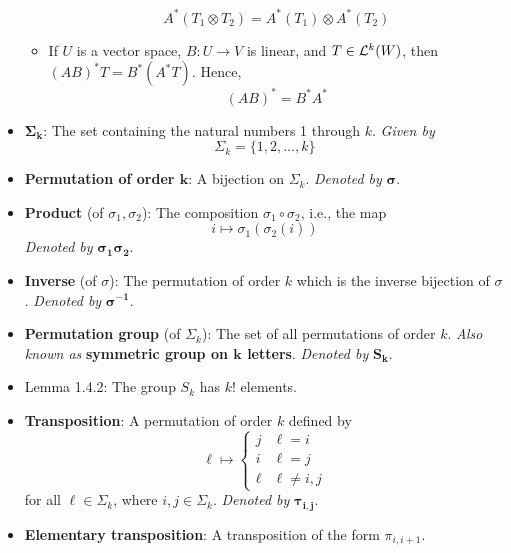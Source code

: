\documentclass[../notes.tex]{subfiles}
\begin{document}
\begin{itemize}
\begin{itemize}
        \begin{equation*}
            A^*(T_1\otimes T_2) = A^*(T_1)\otimes A^*(T_2)
        \end{equation*}
        \item If $U$ is a vector space, $B:U\to V$ is linear, and $T\in\lin[k]{W}$, then $(AB)^*T=B^*(A^*T)$. Hence,
        \begin{equation*}
            (AB)^* = B^*A^*
        \end{equation*}
    \end{itemize}
    \item {}$\bm{\Sigma_k}$: The set containing the natural numbers 1 through $k$. \emph{Given by}
    \begin{equation*}
        \Sigma_k = \{1,2,\dots,k\}
    \end{equation*}
    \item \textbf{Permutation of order $\bm{k}$}: A bijection on $\Sigma_k$. \emph{Denoted by} $\bm{\sigma}$.
    \item \textbf{Product} (of $\sigma_1,\sigma_2$): The composition $\sigma_1\circ\sigma_2$, i.e., the map
    \begin{equation*}
        i \mapsto \sigma_1(\sigma_2(i))
    \end{equation*}
    \emph{Denoted by} $\bm{\sigma_1\sigma_2}$.
    \item \textbf{Inverse} (of $\sigma$): The permutation of order $k$ which is the inverse bijection of $\sigma$. \emph{Denoted by} $\bm{\sigma^{-1}}$.
    \item \textbf{Permutation group} (of $\Sigma_k$): The set of all permutations of order $k$. \emph{Also known as} \textbf{symmetric group on $\bm{k}$ letters}. \emph{Denoted by} $\bm{S_k}$.
    \item Lemma 1.4.2: The group $S_k$ has $k!$ elements.
    \item \textbf{Transposition}: A permutation of order $k$ defined by
    \begin{equation*}
        \ell \mapsto
        \begin{cases}
            j & \ell=i\\
            i & \ell=j\\
            \ell & \ell\neq i,j
        \end{cases}
    \end{equation*}
    for all $\ell\in\Sigma_k$, where $i,j\in\Sigma_k$. \emph{Denoted by} $\bm{\tau_{i,j}}$.
    \item \textbf{Elementary transposition}: A transposition of the form $\pi_{i,i+1}$.

\end{itemize}
\end{document}
